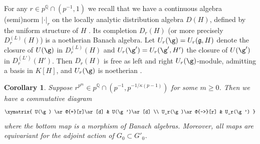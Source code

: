 \documentclass[a4paper]{amsart}
\numberwithin{equation}{section}
\newtheorem{cor}[thm]{Corollary}
\theoremstyle{remark}
\theoremstyle{definition}
\newcommand{\Q}{\mathbb{Q}}
\begin{document}
For any $r \in p^{\Q} \cap (p^{-1},1)$ we recall that we have a continuous algebra (semi)norm $\lvert\cdot\rvert_r$ on the locally analytic distribution algebra $D(H)$, defined by the uniform structure of $H$ \cite[2.2.6]{OS}.
Its completion $D_r(H)$ (or more precisely $D^{(L)}_r(H)$) is a noetherian Banach algebra.
Let $U_r(\g) = U_{r}(\mathfrak{g},H)$ denote the closure of $U(\g)$ in $D^{(L)}_r(H)$ and $U_r(\g') = U_r(\g',H')$ the closure of $U(\g')$ in $D^{(L')}_r(H')$.
Then $D_r(H)$ is free as left and right $U_r(\g)$-module, admitting a basis in $K[H]$, and $U_r(\g)$ is noetherian \cite[Theorem 1.4.2]{MR2309143}.

\begin{cor}\label{cor:distrib}
  Suppose $r^{p^m} \in p^{\Q} \cap (p^{-1},p^{-1/\kappa(p-1)})$ for some $m \ge 0$.   Then we have a commutative diagram
  \begin{equation*}
    \xymatrix{
    U(\g) \ar@{=}[r]\ar[d] & U(\g')\ar[d] \\
    U_r(\g)\ar@{-->}[r] & U_r(\g')
    }
  \end{equation*}
  where the bottom map is a morphism of Banach algebras.
  Moreover, all maps are equivariant for the adjoint action of $G_0 \subset G'_0$.
\end{cor}
\end{document}
